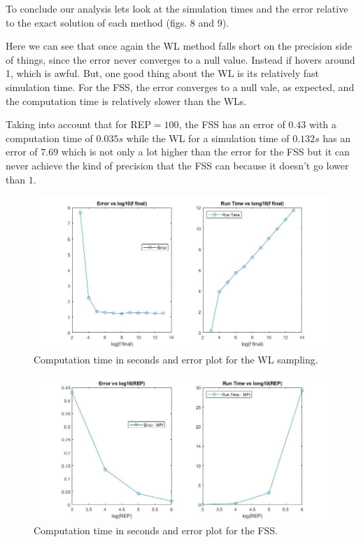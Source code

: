 \documentclass[a4paper, 11pt]{article}
\begin{document}
	 To conclude our analysis lets look at the simulation times and the error relative to the exact solution of each method (figs. 8 and 9).
	 
	 Here we can see that once again the WL method falls short on the precision side of things, since the error never converges to a null value. Instead if hovers around 1, which is awful. But, one good thing about the WL is its relatively fast simulation time. For the FSS, the error converges to a null vale, as expected, and the computation time is relatively slower than the WLs. 
	 
	 Taking into account that for REP$=100$, the FSS has an error of $0.43$ with a computation time of $0.035s$ while the WL for a simulation time of $0.132s$ has an error of $7.69$ which is not only a lot higher than the error for the FSS but it can never achieve the kind of precision that the FSS can because it doesn't go lower than $1$.
	 
	 \begin{figure}[h]
	 	\includegraphics[scale=0.35]{run_time_error_WL}
	 	\centering
	 	\caption{Computation time in seconds and error plot for the WL sampling.}
	 \end{figure}
	 
	 \begin{figure}[h]
	 	\includegraphics[scale=0.35]{run_time_error_new_rps}
	 	\centering
	 	\caption{Computation time in seconds and error plot for the FSS.}
	 \end{figure}
	 
\end{document}
